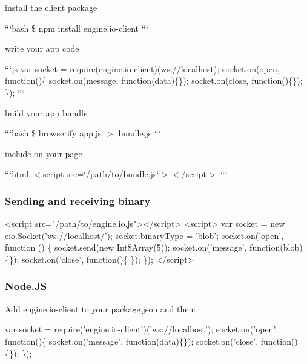\begin{DoxyEnumerate}
\item install the client package

```bash \$ npm install engine.\+io-\/client ```
\end{DoxyEnumerate}
\begin{DoxyEnumerate}
\item write your app code

```js var socket = require(\textquotesingle{}engine.\+io-\/client\textquotesingle{})(\textquotesingle{}ws\+://localhost\textquotesingle{}); socket.\+on(\textquotesingle{}open\textquotesingle{}, function()\{ socket.\+on(\textquotesingle{}message\textquotesingle{}, function(data)\{\}); socket.\+on(\textquotesingle{}close\textquotesingle{}, function()\{\}); \}); ```
\end{DoxyEnumerate}
\begin{DoxyEnumerate}
\item build your app bundle

```bash \$ browserify app.\+js $>$ bundle.\+js ```
\end{DoxyEnumerate}
\begin{DoxyEnumerate}
\item include on your page

```html $<$script src=\char`\"{}/path/to/bundle.\+js\char`\"{}$>$$<$/script$>$ ```
\end{DoxyEnumerate}

\subsubsection*{Sending and receiving binary}


\begin{DoxyCode}
<script src="/path/to/engine.io.js"></script>
<script>
  var socket = new eio.Socket('ws://localhost/');
  socket.binaryType = 'blob';
  socket.on('open', function () \{
    socket.send(new Int8Array(5));
    socket.on('message', function(blob)\{\});
    socket.on('close', function()\{ \});
  \});
</script>
\end{DoxyCode}


\subsubsection*{Node.\+JS}

Add {\ttfamily engine.\+io-\/client} to your {\ttfamily package.\+json} and then\+:


\begin{DoxyCode}
var socket = require('engine.io-client')('ws://localhost');
socket.on('open', function()\{
  socket.on('message', function(data)\{\});
  socket.on('close', function()\{\});
\});
\end{DoxyCode}


